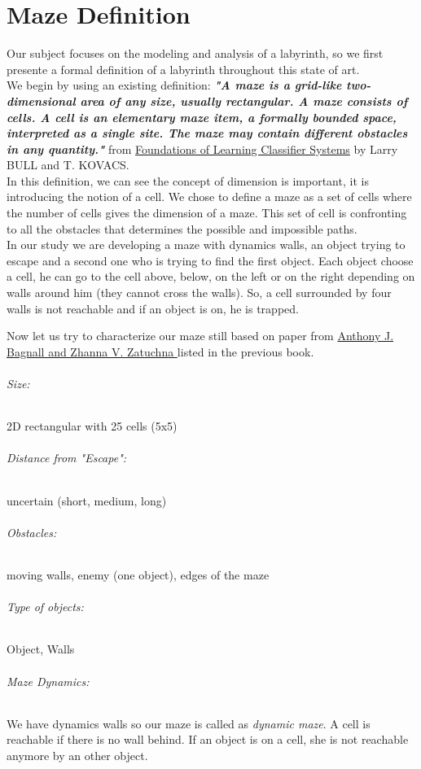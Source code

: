 \chapter{Maze Definition} %
Our subject focuses on the modeling and analysis of a labyrinth, so we first presente a formal definition of a labyrinth throughout this state of art.\\ %
We begin by using an existing definition: \textit{\textbf{"A maze is a grid-like two-dimensional area of any size, usually rectangular. A maze consists of cells. A cell is an elementary maze item, a formally bounded space, interpreted as a single site. The maze may contain different obstacles in any quantity."}} from \underline{Foundations of Learning Classifier Systems} by Larry BULL and T. KOVACS.
\\

In this definition, we can see the concept of dimension is important, it is introducing the notion of a cell. We chose to define a maze as a set of cells where the number of cells gives the dimension of a maze. This set of cell is confronting to all the obstacles that determines the possible and impossible paths. \\
In our study we are developing a maze with dynamics walls, an object trying to escape and a second one who is trying to find the first object. Each object choose a cell, he can go to the cell above, below, on the left or on the right depending on walls around him (they cannot cross the walls). So, a cell surrounded by four walls is not reachable and if an object is on, he is trapped. 

Now let us try to characterize our maze still based on paper from \underline{Anthony J. Bagnall and Zhanna V. Zatuchna } listed in the previous book.
\subparagraph{Size:}
2D rectangular with 25 cells (5x5)
\subparagraph{Distance from "Escape":} uncertain (short, medium, long)
\subparagraph{Obstacles:} moving walls, enemy (one object), edges of the maze
\subparagraph{Type of objects:} Object, Walls
\subparagraph{Maze Dynamics:} We have dynamics walls so our maze is called as \textit{dynamic maze}. A cell is reachable if there is no wall behind. If an object is on a cell, she is not reachable anymore by an other object.\\



